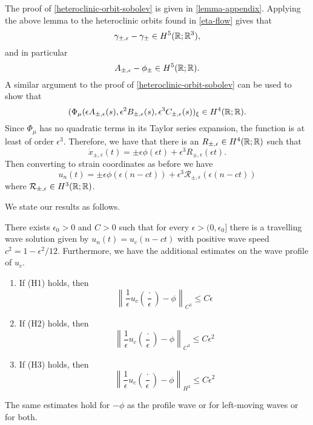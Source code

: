 The proof of \cref{heteroclinic-orbit-sobolev} is given in \cref{lemma-appendix}.
Applying the above lemma to the heteroclinic orbits found in \cref{eta-flow} gives that 
\begin{equation}
	\gamma_{\pm, \epsilon} - \gamma_{\pm} \in H^5(\mathbb{R};\mathbb{R}^3),
\end{equation}
and in particular
\begin{equation}
	A_{\pm, \epsilon} - \phi_{\pm} \in H^5(\mathbb{R};\mathbb{R}).
\end{equation}
A similar argument to the proof of \cref{heteroclinic-orbit-sobolev} can be used to show that 
\begin{equation}
	(\Phi_\mu(\epsilon A_{\pm, \epsilon}(s),\epsilon^2 B_{\pm, \epsilon}(s) ,\epsilon^3 C_{\pm, \epsilon}(s))_\xi \in H^4(\mathbb{R};\mathbb{R}).
\end{equation}
Since \(\Phi_\mu\) has no quadratic terms in its Taylor series expansion, the function is at least of order \(\epsilon^3\). Therefore, we have that there is an \(R_{\pm,\epsilon} \in H^4(\mathbb{R};\mathbb{R})\) such that
\begin{equation}
	\dot x_{\pm, \epsilon }(t) = \pm \epsilon\phi(\epsilon t) + \epsilon^3 R_{\pm,\epsilon}(\epsilon t).
\end{equation}
Then converting to strain coordinates as before we have
\begin{equation}
	u_n(t) = \pm\epsilon\phi(\epsilon(n-ct)) + \epsilon^3 \mathcal R_{\pm, \epsilon}(\epsilon(n-ct))
\end{equation}
where \(\mathcal R_{\pm, \epsilon} \in H^3(\mathbb{R};\mathbb{R})\).

We state our results as follows.
\begin{theorem}
	There exists \(\epsilon_0> 0\) and \(C> 0\) such that for every \(\epsilon > (0,\epsilon_0]\) there is a travelling wave solution given by \(u_n(t) = u_c(n-ct)\) with positive wave speed \(c^2 = 1 - \epsilon^2/12\). Furthermore, we have the additional estimates on the wave profile of \(u_c\).
	\begin{enumerate}[label = (\roman*)]
		\item If (H1) holds, then
		\begin{equation}
			\left\| \frac 1 \epsilon u_c\left(\frac \cdot \epsilon \right) - \phi \right\|_{C^3} \leq C \epsilon
		\end{equation}
		\item If (H2) holds, then
		\begin{equation}
			\left\| \frac 1 \epsilon u_c\left(\frac \cdot \epsilon \right) - \phi \right\|_{C^3} \leq C \epsilon^2
		\end{equation}
		\item If (H3) holds, then
		\begin{equation}
			\left\| \frac 1 \epsilon u_c\left(\frac \cdot \epsilon \right) - \phi \right\|_{H^3} \leq C \epsilon^2
		\end{equation}
	\end{enumerate}
\end{theorem}
The same estimates hold for \(-\phi\) as the profile wave or for left-moving waves or for both.